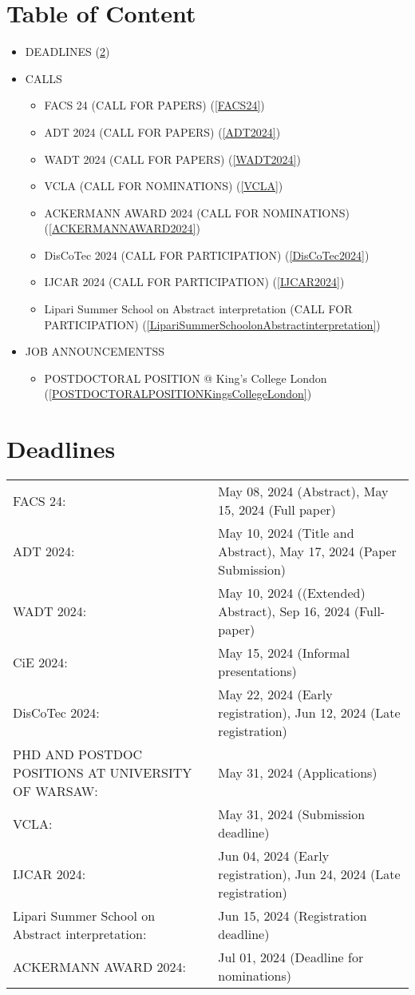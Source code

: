 \documentclass[prodmode,acmtecs]{acmsmall} %
\begin{document}
\section{Table of Content}\begin{itemize}\item DEADLINES (\cref{deadlines}) 
 
\item CALLS 
 
\begin{itemize}\item FACS 24 (CALL FOR PAPERS) (\cref{FACS24})
\item ADT 2024 (CALL FOR PAPERS) (\cref{ADT2024})
\item WADT 2024 (CALL FOR PAPERS) (\cref{WADT2024})
\item VCLA (CALL FOR NOMINATIONS) (\cref{VCLA})
\item ACKERMANN AWARD 2024 (CALL FOR NOMINATIONS) (\cref{ACKERMANNAWARD2024})
\item DisCoTec 2024 (CALL FOR PARTICIPATION) (\cref{DisCoTec2024})
\item IJCAR 2024 (CALL FOR PARTICIPATION) (\cref{IJCAR2024})
\item Lipari Summer School on Abstract interpretation (CALL FOR PARTICIPATION) (\cref{LipariSummerSchoolonAbstractinterpretation})
\end{itemize} 
\item JOB ANNOUNCEMENTSS 
 
\begin{itemize}\item POSTDOCTORAL POSITION @ King's College London (\cref{POSTDOCTORALPOSITIONKingsCollegeLondon})
\end{itemize} 
\end{itemize}\section{Deadlines}\label{deadlines}\begin{tabulary}{\linewidth}{LL}FACS 24:  & May 08, 2024 (Abstract), May 15, 2024 (Full paper) \\
ADT 2024:  & May 10, 2024 (Title and Abstract), May 17, 2024 (Paper Submission) \\
WADT 2024:  & May 10, 2024 ((Extended) Abstract), Sep 16, 2024 (Full-paper) \\
CiE 2024:  & May 15, 2024 (Informal presentations) \\
DisCoTec 2024:  & May 22, 2024 (Early registration), Jun 12, 2024 (Late registration) \\
PHD AND POSTDOC POSITIONS AT UNIVERSITY OF WARSAW:  & May 31, 2024 (Applications) \\
VCLA:  & May 31, 2024 (Submission deadline) \\
IJCAR 2024:  & Jun 04, 2024 (Early registration), Jun 24, 2024 (Late registration) \\
Lipari Summer School on Abstract interpretation:  & Jun 15, 2024 (Registration deadline) \\
ACKERMANN AWARD 2024:  & Jul 01, 2024 (Deadline for nominations) \\
\end{tabulary}
\end{document}
